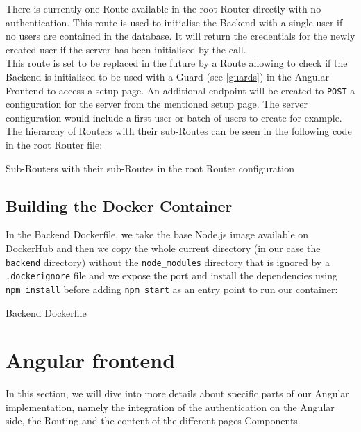 \documentclass[twoside, openright,11pt,a4paper]{book}
\newenvironment{code}{\captionsetup{type=listing}}{}
\begin{document}
There is currently one Route available in the root Router directly with no authentication. This route is used to initialise the Backend with a single user if no users are contained in the database. It will return the credentials for the newly created user if the server has been initialised by the call. \\

This route is set to be replaced in the future by a Route allowing to check if the Backend is initialised to be used with a Guard (see \ref{guards}) in the Angular Frontend to access a setup page. An additional endpoint will be created to \verb+POST+ a configuration for the server from the mentioned setup page. The server configuration would include a first user or batch of users to create for example. \\

The hierarchy of Routers with their sub-Routes can be seen in the following code in the root Router file:
\begin{code}
	\caption{Sub-Routers with their sub-Routes in the root Router configuration}
\end{code}
\subsection{Building the Docker Container}
\label{container_backend}
In the Backend Dockerfile, we take the base Node.js image\cite{docker:hub:node} available on DockerHub and then we copy the whole current directory (in our case the \verb+backend+ directory) without the \verb+node_modules+ directory that is ignored by a \verb+.dockerignore+ file and we expose the port and install the dependencies using \verb+npm install+ before adding \verb+npm start+ as an entry point to run our container:
\begin{code}
\caption{Backend Dockerfile}	
\end{code}


\section{Angular frontend}
In this section, we will dive into more details about specific parts of our Angular implementation, namely the integration of the authentication on the Angular side, the Routing and the content of the different pages Components. \\
\end{document}
